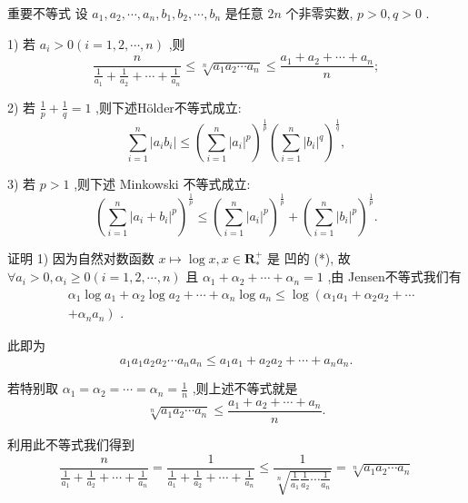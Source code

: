 重要不等式 设 ${a}_{1},{a}_{2},\cdots ,{a}_{n},{b}_{1},{b}_{2},\cdots ,{b}_{n}$ 是任意 ${2n}$ 个非零实数, $p > 0,q > 0$ .

1) 若 ${a}_{i} > 0\left( {i = 1,2,\cdots ,n}\right)$ ,则
$$\frac{n}{\frac{1}{{a}_{1}} + \frac{1}{{a}_{2}} + \cdots  + \frac{1}{{a}_{n}}} \leq  \sqrt[n]{{a}_{1}{a}_{2}\cdots {a}_{n}} \leq  \frac{{a}_{1} + {a}_{2} + \cdots  + {a}_{n}}{n};$$

2) 若 $\frac{1}{p} + \frac{1}{q} = 1$ ,则下述Hölder不等式成立:
$$\mathop{\sum }\limits_{{i = 1}}^{n}\left| {{a}_{i}{b}_{i}}\right|  \leq  {\left( \mathop{\sum }\limits_{{i = 1}}^{n}{\left| {a}_{i}\right| }^{p}\right) }^{\frac{1}{p}}{\left( \mathop{\sum }\limits_{{i = 1}}^{n}{\left| {b}_{i}\right| }^{q}\right) }^{\frac{1}{q}},$$

3) 若 $p > 1$ ,则下述 Minkowski 不等式成立:
$${\left( \mathop{\sum }\limits_{{i = 1}}^{n}{\left| {a}_{i} + {b}_{i}\right| }^{p}\right) }^{\frac{1}{p}} \leq  {\left( \mathop{\sum }\limits_{{i = 1}}^{n}{\left| {a}_{i}\right| }^{p}\right) }^{\frac{1}{p}} + {\left( \mathop{\sum }\limits_{{i = 1}}^{n}{\left| {b}_{i}\right| }^{p}\right) }^{\frac{1}{p}}.$$

证明 1) 因为自然对数函数 $x \mapsto  \log x,x \in  {\mathbf{R}}_{ * }^{ + }$ 是 凹的 (*), 故 $\forall {a}_{i} > 0,{\alpha }_{i} \geq  0\left( {i = 1,2,\cdots ,n}\right)$ 且 ${\alpha }_{1} + {\alpha }_{2} + \cdots  + {\alpha }_{n} = 1$ ,由 Jensen不等式我们有
\begin{align*}
	&{\alpha }_{1}\log {a}_{1} + {\alpha }_{2}\log {a}_{2} + \cdots  + {\alpha }_{n}\log {a}_{n} \leq  \log \left( {{\alpha }_{1}{a}_{1} + {\alpha }_{2}{a}_{2} + \cdots }\right.\\
	&\left. {+{\alpha }_{n}{a}_{n}}\right) \text{ . }
\end{align*}

此即为
$${a}_{1}{a}_{1}{a}_{2}{a}_{2}\cdots {a}_{n}{a}_{n} \leq  {a}_{1}{a}_{1} + {a}_{2}{a}_{2} + \cdots  + {a}_{n}{a}_{n}.$$

若特别取 ${\alpha }_{1} = {\alpha }_{2} = \cdots  = {\alpha }_{n} = \frac{1}{n}$ ,则上述不等式就是
$$\sqrt[n]{{a}_{1}{a}_{2}\cdots {a}_{n}} \leq  \frac{{a}_{1} + {a}_{2} + \cdots  + {a}_{n}}{n}.$$

利用此不等式我们得到
$$\frac{n}{\frac{1}{{a}_{1}} + \frac{1}{{a}_{2}} + \cdots  + \frac{1}{{a}_{n}}} = \frac{1}{\frac{1}{{a}_{1}} + \frac{1}{{a}_{2}} + \cdots  + \frac{1}{{a}_{n}}} \leq  \frac{1}{\sqrt[n]{\frac{1}{{a}_{1}}\frac{1}{{a}_{2}}\cdots \frac{1}{{a}_{n}}}} = \sqrt[n]{{a}_{1}{a}_{2}\cdots {a}_{n}}$$


